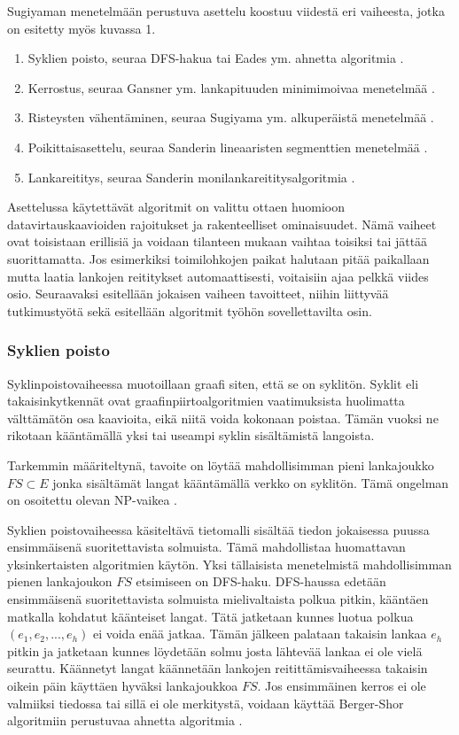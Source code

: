 \documentclass[finnish,12pt]{article}
\begin{document}
Sugiyaman menetelmään perustuva asettelu koostuu viidestä eri vaiheesta, jotka on esitetty myös kuvassa 1.
\begin{enumerate}
  \item Syklien poisto, seuraa DFS-hakua \cite{RefWorks:69} tai Eades ym. ahnetta algoritmia \cite{RefWorks:48}.
  \item Kerrostus, seuraa Gansner ym. lankapituuden minimimoivaa menetelmää \cite{RefWorks:28}.
  \item Risteysten vähentäminen, seuraa Sugiyama ym. alkuperäistä menetelmää \cite{RefWorks:9}.
  \item Poikittaisasettelu, seuraa Sanderin lineaaristen segmenttien menetelmää \cite{RefWorks:49}.
  \item Lankareititys, seuraa Sanderin monilankareititysalgoritmia \cite{RefWorks:17}.

\end{enumerate}

Asettelussa käytettävät algoritmit on valittu ottaen huomioon datavirtauskaavioiden rajoitukset ja rakenteelliset ominaisuudet.
Nämä vaiheet ovat toisistaan erillisiä ja voidaan tilanteen mukaan vaihtaa toisiksi tai jättää suorittamatta.
Jos esimerkiksi toimilohkojen paikat halutaan pitää paikallaan mutta laatia lankojen reititykset automaattisesti, voitaisiin ajaa pelkkä viides osio.
Seuraavaksi esitellään jokaisen vaiheen tavoitteet, niihin liittyvää tutkimustyötä sekä esitellään algoritmit työhön sovellettavilta osin.

		\subsubsection{Syklien poisto}

Syklinpoistovaiheessa muotoillaan graafi siten, että se on syklitön.
Syklit eli takaisinkytkennät ovat graafinpiirtoalgoritmien vaatimuksista huolimatta välttämätön osa kaavioita, eikä niitä voida kokonaan poistaa.
Tämän vuoksi ne rikotaan kääntämällä yksi tai useampi syklin sisältämistä langoista.

Tarkemmin määriteltynä, tavoite on löytää mahdollisimman pieni lankajoukko $FS \subset E $ jonka sisältämät langat kääntämällä verkko on syklitön.
Tämä ongelman on osoitettu olevan NP-vaikea \cite{RefWorks:65}. 

Syklien poistovaiheessa käsiteltävä tietomalli sisältää tiedon jokaisessa puussa ensimmäisenä suoritettavista solmuista.
Tämä mahdollistaa huomattavan yksinkertaisten algoritmien käytön.
Yksi tällaisista menetelmistä mahdollisimman pienen lankajoukon $FS$ etsimiseen on DFS-haku.
DFS-haussa edetään ensimmäisenä suoritettavista solmuista mielivaltaista polkua pitkin, kääntäen matkalla kohdatut käänteiset langat. Tätä jatketaan kunnes luotua polkua $(e_1,e_2, ..., e_h)$ ei voida enää jatkaa.
Tämän jälkeen palataan takaisin lankaa $e_h$ pitkin ja jatketaan kunnes löydetään solmu josta lähtevää lankaa ei ole vielä seurattu. \cite{RefWorks:69}
Käännetyt langat käännetään lankojen reitittämisvaiheessa takaisin oikein päin käyttäen hyväksi lankajoukkoa $FS$.
Jos ensimmäinen kerros ei ole valmiiksi tiedossa tai sillä ei ole merkitystä, voidaan käyttää Berger-Shor algoritmiin \cite{RefWorks:68} perustuvaa ahnetta algoritmia \cite{RefWorks:48}.
\end{document}
